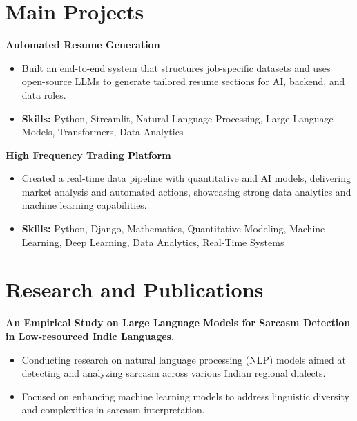 \documentclass[a4paper,11pt]{article}
\begin{document}
\section{\textbf{Main Projects}}

\vspace{1mm}
  \textbf{Automated Resume Generation  }
\vspace{-1.5mm} %
\begin{itemize}
  \item Built an end-to-end system that structures job-specific datasets and uses open-source LLMs to generate tailored resume sections for AI, backend, and data roles.
\vspace{-3mm}
  \item \textbf{Skills:} Python, Streamlit, Natural Language Processing, Large Language Models, Transformers, Data Analytics
\end{itemize}


\vspace{1mm}
   \textbf{High Frequency Trading Platform }
\vspace{-1.5mm} %
\begin{itemize}
  \item Created a real-time data pipeline with quantitative and AI models, delivering market analysis and automated actions, showcasing strong data analytics and machine learning capabilities.
\vspace{-3mm}
  \item \textbf{Skills:} Python, Django, Mathematics, Quantitative Modeling, Machine Learning, Deep Learning, Data Analytics, Real-Time Systems
\end{itemize}



\section{\textbf{Research and Publications} \hfill }
\vspace{1mm}
  \textbf{An Empirical Study on Large Language Models for Sarcasm Detection in Low-resourced Indic Languages}.
\vspace{-1mm} %
\begin{itemize}
  \item Conducting research on natural language processing (NLP) models aimed at detecting and analyzing sarcasm across various Indian regional dialects.
\vspace{-3mm}
  \item Focused on enhancing machine learning models to address linguistic diversity and complexities in sarcasm interpretation.
\end{itemize}
\end{document}
